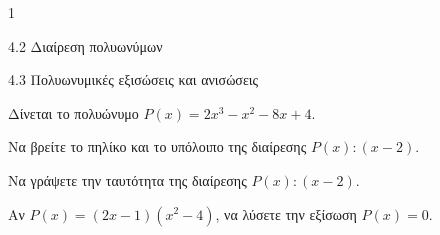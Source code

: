 \begin{ylh}{1}
\item 4.2 Διαίρεση πολυωνύμων
\item 4.3 Πολυωνυμικές εξισώσεις και ανισώσεις
\end{ylh}
Δίνεται το πολυώνυμο $P(x) = 2x^3 - x^2 - 8x + 4$.
\begin{alist}
\item
\begin{rlist}
\item Να βρείτε το πηλίκο και το υπόλοιπο της διαίρεσης $P(x) : (x - 2)$.
\item Να γράψετε την ταυτότητα της διαίρεσης $P(x) : (x - 2)$.
\end{rlist}
\item Αν $P(x) = (2x - 1)(x^2 - 4)$, να λύσετε την εξίσωση $P(x) = 0$.
\end{alist}

